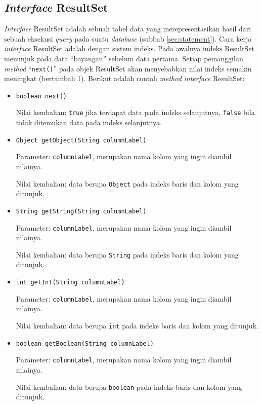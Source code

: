 \subsection{\textit{Interface} ResultSet}
\label{sec:resultset}
\textit{Interface} ResultSet adalah sebuah tabel data yang merepresentasikan hasil dari sebuah eksekusi \textit{query} pada suatu \textit{database}\cite{packagejavasql} (subbab \ref{sec:statement}). Cara kerja \textit{interface} ResultSet adalah dengan sistem indeks. Pada awalnya indeks ResultSet menunjuk pada data ``bayangan'' sebelum data pertama. Setiap pemanggilan \textit{method} ``\texttt{next()}'' pada objek ResultSet akan menyebabkan nilai indeks semakin meningkat (bertambah 1). Berikut adalah contoh \textit{method} \textit{interface} ResultSet:
\begin{itemize}
	\item \texttt{boolean next()}
	
	Nilai kembalian: \texttt{true} jika terdapat data pada indeks selanjutnya, \texttt{false} bila tidak ditemukan data pada indeks selanjutnya.

	\item \texttt{Object getObject(String columnLabel)}
	
	Parameter: \texttt{columnLabel}, merupakan nama kolom yang ingin diambil nilainya.
	
	Nilai kembalian: data berupa \texttt{Object} pada indeks baris dan kolom yang ditunjuk.
	
	\item \texttt{String getString(String columnLabel)}
	
	Parameter: \texttt{columnLabel}, merupakan nama kolom yang ingin diambil nilainya.
	
	Nilai kembalian: data berupa \texttt{String} pada indeks baris dan kolom yang ditunjuk.
	
	\item \texttt{int getInt(String columnLabel)}
	
	Parameter: \texttt{columnLabel}, merupakan nama kolom yang ingin diambil nilainya.
	
	Nilai kembalian: data berupa \texttt{int} pada indeks baris dan kolom yang ditunjuk.
	
	\item \texttt{boolean getBoolean(String columnLabel)}
	
	Parameter: \texttt{columnLabel}, merupakan nama kolom yang ingin diambil nilainya.
	
	Nilai kembalian: data berupa \texttt{boolean} pada indeks baris dan kolom yang ditunjuk.
\end{itemize}



